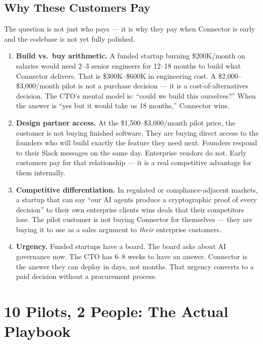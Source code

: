 \subsection*{Why These Customers Pay}

The question is not just who pays --- it is why they pay when Connector is
early and the codebase is not yet fully polished.

\begin{enumerate}[leftmargin=1.8em, itemsep=5pt]
  \item \textbf{Build vs.\ buy arithmetic.}\;
    A funded startup burning \$200K/month on salaries would need 2--3
    senior engineers for 12--18 months to build what Connector delivers.
    That is \$300K--\$600K in engineering cost. A \$2,000--\$3,000/month
    pilot is not a purchase decision --- it is a cost-of-alternatives
    decision. The CTO's mental model is: ``could we build this ourselves?''
    When the answer is ``yes but it would take us 18 months,'' Connector
    wins.

  \item \textbf{Design partner access.}\;
    At the \$1,500--\$3,000/month pilot price, the customer is not buying
    finished software. They are buying direct access to the founders who
    will build exactly the feature they need next. Founders respond to their
    Slack messages on the same day. Enterprise vendors do not. Early
    customers pay for that relationship --- it is a real competitive advantage
    for them internally.

  \item \textbf{Competitive differentiation.}\;
    In regulated or compliance-adjacent markets, a startup that can say
    ``our AI agents produce a cryptographic proof of every decision'' to
    their own enterprise clients wins deals that their competitors lose.
    The pilot customer is not buying Connector for themselves --- they are
    buying it to use as a sales argument to \emph{their} enterprise customers.

  \item \textbf{Urgency.}\;
    Funded startups have a board. The board asks about AI governance now.
    The CTO has 6--8 weeks to have an answer. Connector is the answer they
    can deploy in days, not months. That urgency converts to a paid decision
    without a procurement process.
\end{enumerate}

\section*{10 Pilots, 2 People: The Actual Playbook}

